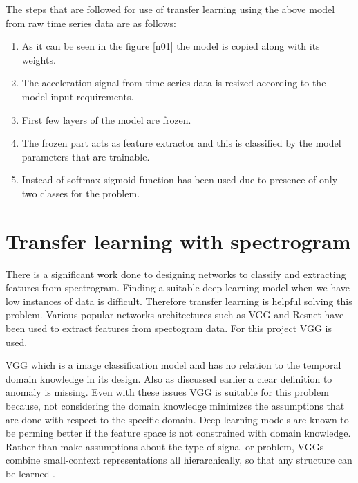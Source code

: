   
     
   The steps that are followed for use of transfer learning using the above model from raw time series data are as follows:
   \begin{enumerate} 
   	\item As it can be seen in the figure \ref{n01} the model is copied along with its weights.
   	\item The acceleration signal from time series data is resized according to the model input requirements. 
   	\item First few layers of the model are frozen.
   	\item The frozen part acts as feature extractor and this is classified by the model parameters that  are trainable.
   	\item Instead of softmax sigmoid function has been used due to presence of only two classes for the problem.
     \end{enumerate}  
   
 
   \section{Transfer learning with spectrogram}   
  There is a significant work done to designing networks to classify and extracting features from spectrogram. Finding a suitable deep-learning model when we have low instances of data is difficult. Therefore transfer learning is helpful solving this problem. Various popular networks architectures such as VGG and Resnet have been used to extract features from spectogram data. For this project VGG is used. 
  
  VGG which is a image classification model and has no relation to the temporal domain knowledge in its design. Also as discussed earlier a clear definition to anomaly is missing. Even with these issues VGG is suitable for this problem because, not considering the domain knowledge minimizes the assumptions that are done with respect to the specific domain. Deep learning models are known to be perming better if the feature space is not constrained with domain knowledge. Rather than make assumptions about the type of signal or problem, VGGs combine small-context representations all hierarchically, so that any structure can be learned \cite{vgg}. 
  
